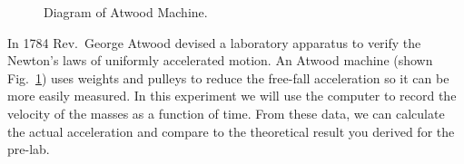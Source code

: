 \begin{figure}[!hbt]     %
\begin{center}
{}
\end{center}
\caption{Diagram of Atwood Machine.
          \label{fig:atwood}}
\end{figure}
In 1784 Rev.\ George Atwood devised a laboratory apparatus 
to verify the Newton's laws of uniformly accelerated motion.
An Atwood machine (shown Fig.~\ref{fig:atwood}) uses weights and pulleys to 
reduce the free-fall acceleration so it can be more easily measured.
In this experiment we will use
the computer to record the
velocity of the masses as a function of time.  From these data, we can
calculate the actual acceleration and compare to the theoretical result
you derived for the pre-lab.

